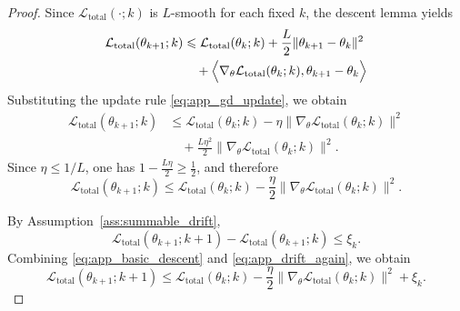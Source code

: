 \documentclass{article}
\theoremstyle{plain}
\theoremstyle{definition}
\theoremstyle{remark}
\begin{document}
\begin{proof}
	Since $\mathcal{L}_{\mathrm{total}}(\cdot;k)$ is $L$-smooth for each
	fixed $k$, the descent lemma yields
	\begin{align}
		\mathcal{L}_{\mathrm{total}}(\theta_{k+1};k)
		&\leqslant
		\mathcal{L}_{\mathrm{total}}(\theta_k;k)
		+ 
		\frac{L}{2}\|\theta_{k+1}-\theta_k\|^2 \nonumber\\
		& \quad
		+ \Bigl\langle
		\nabla_{\theta}\mathcal{L}_{\mathrm{total}}(\theta_k;k),
		\theta_{k+1}-\theta_k
		\Bigr\rangle
		\label{eq:app_descent_lemma}
	\end{align}
	Substituting the update rule \eqref{eq:app_gd_update}, we obtain
	\begin{align}
		\mathcal{L}_{\mathrm{total}}(\theta_{k+1};k)
		&\leqslant
		\mathcal{L}_{\mathrm{total}}(\theta_k;k)
		-
		\eta
		\bigl\|
		\nabla_{\theta}\mathcal{L}_{\mathrm{total}}(\theta_k;k)
		\bigr\|^2
		\nonumber\\
		&\quad
		+
		\frac{L\eta^2}{2}
		\bigl\|
		\nabla_{\theta}\mathcal{L}_{\mathrm{total}}(\theta_k;k)
		\bigr\|^2.
		\label{eq:app_after_substitution}
	\end{align}
	Since $\eta\leqslant 1/L$, one has
	$1-\frac{L\eta}{2}\geqslant \frac12$, and therefore
	\begin{equation}
		\mathcal{L}_{\mathrm{total}}(\theta_{k+1};k)
		\leqslant
		\mathcal{L}_{\mathrm{total}}(\theta_k;k)
		-
		\frac{\eta}{2}
		\bigl\|
		\nabla_{\theta}\mathcal{L}_{\mathrm{total}}(\theta_k;k)
		\bigr\|^2.
		\label{eq:app_basic_descent}
	\end{equation}
	
	By Assumption~\ref{ass:summable_drift},
	\begin{equation}
		\mathcal{L}_{\mathrm{total}}(\theta_{k+1};k+1)
		-
		\mathcal{L}_{\mathrm{total}}(\theta_{k+1};k)
		\leqslant
		\xi_k.
		\label{eq:app_drift_again}
	\end{equation}
	Combining \eqref{eq:app_basic_descent} and
	\eqref{eq:app_drift_again}, we obtain
	\begin{equation}
		\mathcal{L}_{\mathrm{total}}(\theta_{k+1};k+1)
		\leqslant
		\mathcal{L}_{\mathrm{total}}(\theta_k;k)
		-
		\frac{\eta}{2}
		\bigl\|
		\nabla_{\theta}\mathcal{L}_{\mathrm{total}}(\theta_k;k)
		\bigr\|^2
		+
		\xi_k.
		\label{eq:app_descent_with_drift}
	\end{equation}
	

\end{proof}
\end{document}
